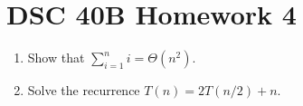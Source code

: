\documentclass{article}
\begin{document}
\section*{DSC 40B Homework 4}
\begin{enumerate}
  \item Show that $\sum_{i=1}^{n} i = \Theta(n^2)$.
  \item Solve the recurrence $T(n) = 2T(n/2) + n$.
\end{enumerate}
\end{document}
